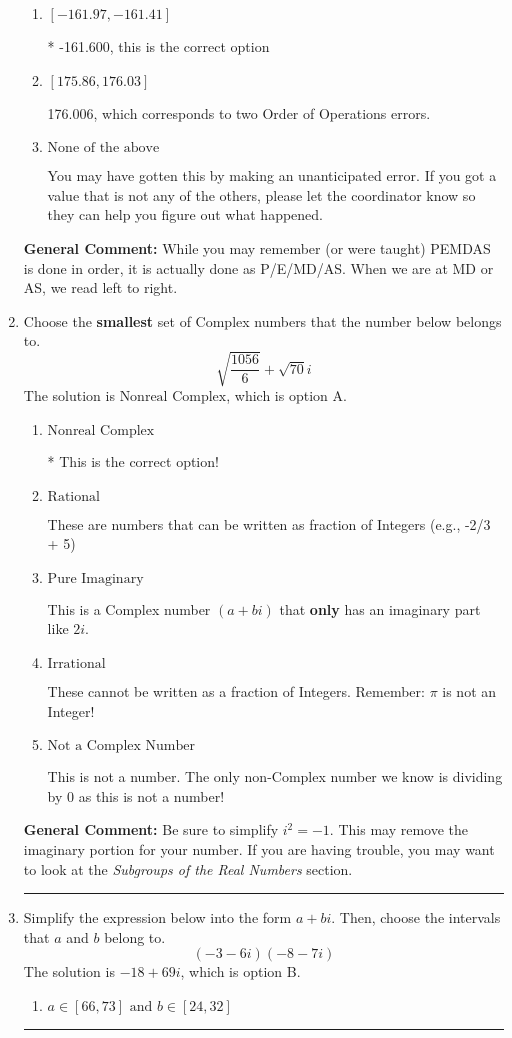 \documentclass{extbook}[14pt]
\newcommand{\litem}[1]{\item #1

\rule{\textwidth}{0.4pt}}
\begin{document}
\begin{enumerate}
{\begin{enumerate}[label=\Alph*.]
 -161.994, which corresponds to an Order of Operations error: not reading left-to-right for multiplication/division.
\item \( [-161.97, -161.41] \)

* -161.600, this is the correct option
\item \( [175.86, 176.03] \)

 176.006, which corresponds to two Order of Operations errors.
\item \( \text{None of the above} \)

 You may have gotten this by making an unanticipated error. If you got a value that is not any of the others, please let the coordinator know so they can help you figure out what happened.
\end{enumerate}

\textbf{General Comment:} While you may remember (or were taught) PEMDAS is done in order, it is actually done as P/E/MD/AS. When we are at MD or AS, we read left to right.
}
\litem{
Choose the \textbf{smallest} set of Complex numbers that the number below belongs to.
\[ \sqrt{\frac{1056}{6}}+\sqrt{70} i \]The solution is \( \text{Nonreal Complex} \), which is option A.\begin{enumerate}[label=\Alph*.]
\item \( \text{Nonreal Complex} \)

* This is the correct option!
\item \( \text{Rational} \)

These are numbers that can be written as fraction of Integers (e.g., -2/3 + 5)
\item \( \text{Pure Imaginary} \)

This is a Complex number $(a+bi)$ that \textbf{only} has an imaginary part like $2i$.
\item \( \text{Irrational} \)

These cannot be written as a fraction of Integers. Remember: $\pi$ is not an Integer!
\item \( \text{Not a Complex Number} \)

This is not a number. The only non-Complex number we know is dividing by 0 as this is not a number!
\end{enumerate}

\textbf{General Comment:} Be sure to simplify $i^2 = -1$. This may remove the imaginary portion for your number. If you are having trouble, you may want to look at the \textit{Subgroups of the Real Numbers} section.
}
\litem{
Simplify the expression below into the form $a+bi$. Then, choose the intervals that $a$ and $b$ belong to.
\[ (-3 - 6 i)(-8 - 7 i) \]The solution is \( -18 + 69 i \), which is option B.\begin{enumerate}[label=\Alph*.]
\item \( a \in [66, 73] \text{ and } b \in [24, 32] \)


\end{enumerate}}
\end{enumerate}
\end{document}
